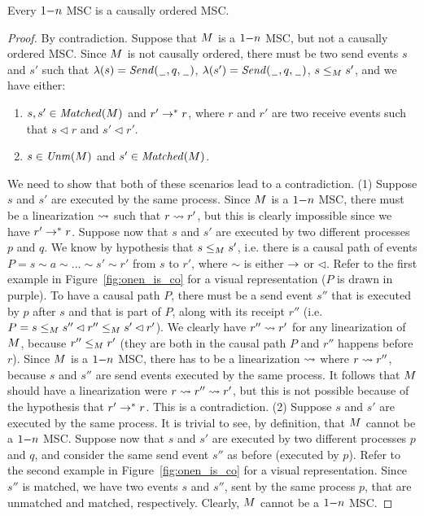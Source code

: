\documentclass{article}
\begin{document}
\begin{proposition}\label{prop:onen_is_co}
	Every $1\mathsf{-}n$ MSC is a causally ordered MSC.
\end{proposition}
\begin{proof}
By contradiction. Suppose that $M$ is a $1\mathsf{-}n$ MSC, but not a causally ordered MSC. Since $M$ is not causally ordered, there must be two send events $s$ and $s'$ such that $\lambda(s)={\mathit{Send}(\hspace{0.1em}\underline{\hspace{0.5em}}\hspace{0.1em},q,\hspace{0.1em}\underline{\hspace{0.5em}}\hspace{0.1em})}$, $\lambda(s')={\mathit{Send}(\hspace{0.1em}\underline{\hspace{0.5em}}\hspace{0.1em},q,\hspace{0.1em}\underline{\hspace{0.5em}}\hspace{0.1em})}$, $s \le_M s'$, and we have either:
\begin{enumerate}\itemsep=0.5ex
	\item $s,s' \in \mathit{Matched}(M)$ and $r' \to^* r$, where $r$ and $r'$ are two receive events such that $s \lhd r$ and $s' \lhd r'$.
	\item  $s \in \mathit{Unm}(M)$ and $s' \in \mathit{Matched}(M)$.
\end{enumerate}
We need to show that both of these scenarios lead to a contradiction. (1) Suppose $s$ and $s'$ are executed by the same process. Since $M$ is a $1\mathsf{-}n$ MSC, there must be a linearization $\rightsquigarrow$ such that $r \rightsquigarrow r'$, but this is clearly impossible since we have $r' \to^* r$. Suppose now that $s$ and $s'$ are executed by two different processes $p$ and $q$. We know by hypothesis that $s \le_M s'$, i.e. there is a causal path of events $P = s \sim a \sim \dots \sim s' \sim r'$ from $s$ to $r'$, where $\sim$ is either $\to$ or $\lhd$. Refer to the first example in Figure~\ref{fig:onen_is_co} for a visual representation ($P$ is drawn in purple). To have a causal path $P$, there must be a send event $s''$ that is executed by $p$ after $s$ and that is part of $P$, along with its receipt $r''$ (i.e. $P = s \le_M s'' \lhd r'' \le_M s' \lhd r'$). We clearly have $r'' \rightsquigarrow r'$ for any linearization of $M$, because $r'' \le_M r'$ (they are both in the causal path $P$ and $r''$ happens before $r$). Since $M$ is a $1\mathsf{-}n$ MSC, there has to be a linearization $\rightsquigarrow$ where $r \rightsquigarrow r''$, because $s$ and $s''$ are send events executed by the same process. It follows that $M$ should have a linearization were $r \rightsquigarrow r'' \rightsquigarrow r'$, but this is not possible because of the hypothesis that $r' \to^* r$. This is a contradiction. (2) Suppose $s$ and $s'$ are executed by the same process. It is trivial to see, by definition, that $M$ cannot be a $1\mathsf{-}n$ MSC. Suppose now that $s$ and $s'$ are executed by two different processes $p$ and $q$, and consider the same send event $s''$ as before (executed by $p$). Refer to the second example in Figure~\ref{fig:onen_is_co} for a visual representation. Since $s''$ is matched, we have two events $s$ and $s''$, sent by the same process $p$, that are unmatched and matched, respectively. Clearly, $M$ cannot be a $1\mathsf{-}n$ MSC.
\end{proof}
\end{document}
